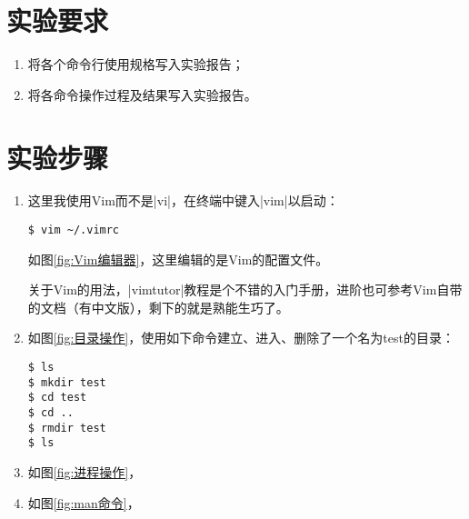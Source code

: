 \documentclass[cs4size,a4paper,nofonts]{ctexart}
\begin{document}
\section{实验要求}
\begin{enumerate}
\item 将各个命令行使用规格写入实验报告；
\item 将各命令操作过程及结果写入实验报告。
\end{enumerate}

\section{实验步骤}

\begin{enumerate}[label={(\arabic*)}]

\item 这里我使用Vim而不是|vi|，在终端中键入|vim|以启动：

\begin{Verbatim}
$ vim ~/.vimrc
\end{Verbatim}

\begin{figure}[htp]
\end{figure}

如图\ref{fig:Vim编辑器}，这里编辑的是Vim的配置文件。

关于Vim的用法，|vimtutor|教程是个不错的入门手册，进阶也可参考Vim自带的文档（有中文版），剩下的就是熟能生巧了。

\item 如图\ref{fig:目录操作}，使用如下命令建立、进入、删除了一个名为test的目录：

\begin{Verbatim}
$ ls
$ mkdir test
$ cd test
$ cd ..
$ rmdir test
$ ls
\end{Verbatim}

\begin{figure}[htp]
\end{figure}

\item 如图\ref{fig:进程操作}，

\begin{figure}[htp]
\end{figure}

\item 如图\ref{fig:man命令}，

\begin{figure}[htp]
\end{figure}

\end{enumerate}
\end{document}
